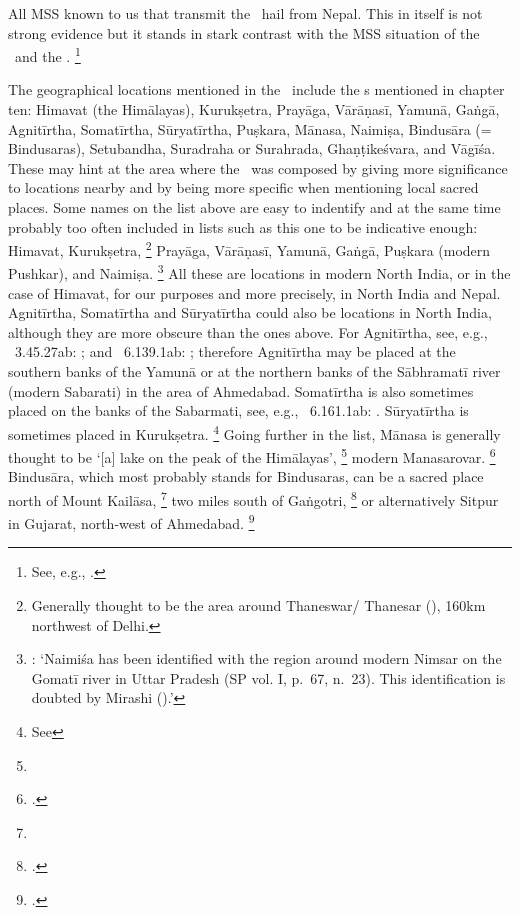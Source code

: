 All MSS known to us that transmit the \VSS\
hail from Nepal. This in itself is not strong evidence
but it stands in stark contrast with the MSS situation
of the \SDHS\ and the \SDHU.%
		\footnote{See, e.g., .}

The geographical locations 
mentioned in the \VSS\ include the
s mentioned in chapter ten:
Himavat (the Himālayas),
Kurukṣetra,
Prayāga,
Vārāṇasī,
Yamunā,
Gaṅgā,
Agnitīrtha, %
Somatīrtha, %
Sūryatīrtha, %
Puṣkara, %
Mānasa, %
Naimiṣa, %
Bindusāra (= Bindusaras), %
Setubandha, %
Suradraha or Sura\-hrada, %
Ghaṇṭikeśvara,
and Vāgīśa.
These may hint at the area where the \VSS\ was
composed by giving more significance to 
locations nearby and by being more specific when
mentioning local sacred places.
Some names on the list above are 
easy to indentify and at the same
time probably too often included in lists such as this one
to be indicative enough: 
Himavat, Kurukṣetra,%
	\footnote{Generally thought to be the area
		around Thaneswar\thinspace /\thinspace
		Thanesar (), 
		160km northwest of Delhi.}	
Prayāga, Vārāṇasī, Yamunā,
Gaṅgā, Puṣkara (modern Pushkar), and Naimiṣa.%
		\footnote{: 
		`Naimiśa has been identified with the region around 
		modern Nimsar on the Gomatī river in Uttar Pradesh
		(SP vol. I, p.~67, n.~23).
		This identification is doubted by Mirashi (\citeyear{MirashiNaimisa}).'}
All these are locations in modern North India, or in the case of Himavat,
for our purposes and more precisely, in North India and Nepal.
Agnitīrtha, Somatīrtha and Sūryatīrtha could also
be locations in North India, although they are
more obscure than the ones above.
For Agnitīrtha, see, e.g., \PadmaP\ 3.45.27ab:      
; and  
\PadmaP\  6.139.1ab:    
; 
therefore Agnitīrtha may be placed at the southern
banks of the Yamunā or at the northern banks of
the Sābhramatī river (modern Sabarati) in the area of
Ahmedabad.
Somatīrtha is also sometimes placed on the banks
of the Sabarmati, see, e.g., \PadmaP\  6.161.1ab:
.
Sūryatīrtha is sometimes placed in Kurukṣetra.%
		\footnote{See 
		}
Going further in the list, Mānasa is generally thought
to be `[a] lake on the peak of the Himālayas',%
	\footnote{}
modern Manasarovar.%
	\footnote{.} 
Bindusāra, which most probably stands for
Bindusaras, can be a sacred place north of Mount
Kailāsa,%
	\footnote{}
two miles south of Gaṅgotri,%
	\footnote{.}
or alternatively Sitpur in Gujarat, north-west of 
Ahmedabad.%
	\footnote{.}
	
